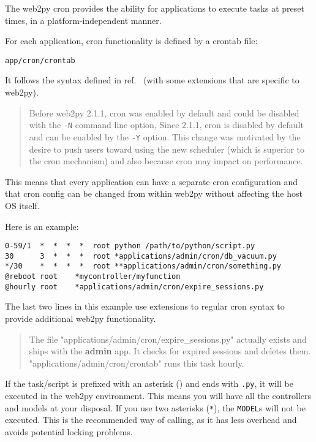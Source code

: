 \documentclass[justified,sixbynine,notoc]{tufte-book}
\def\ft{\small\tt}
\begin{document}
\begin{fullwidth}
The web2py cron provides the ability for applications to execute tasks at preset times, in a platform-independent manner.

For each application, cron functionality is defined by a crontab file:

\begin{lstlisting}
app/cron/crontab
\end{lstlisting}

It follows the syntax defined in ref.~\cite{cron} (with some extensions that are specific to web2py).

\begin{quote}Before web2py 2.1.1, cron was enabled by default and could be disabled with the {\ft -N} command line option, Since 2.1.1, cron is disabled by default and can be enabled by the {\ft -Y} option. This change was motivated by the desire to push users toward using the new scheduler (which is superior to the cron mechanism) and also because cron may impact on performance.\end{quote}
This means that every application can have a separate cron configuration and that cron config can be changed from within web2py without affecting the host OS itself.

Here is an example:
\begin{lstlisting}
0-59/1  *  *  *  *  root python /path/to/python/script.py
30      3  *  *  *  root *applications/admin/cron/db_vacuum.py
*/30    *  *  *  *  root **applications/admin/cron/something.py
@reboot root    *mycontroller/myfunction
@hourly root    *applications/admin/cron/expire_sessions.py
\end{lstlisting}

The last two lines in this example use extensions to regular cron syntax to provide additional web2py functionality.

\begin{quote}The file "applications/admin/cron/expire\_sessions.py" actually exists and ships with the {\bf admin} app. It checks for expired sessions and deletes them. "applications/admin/cron/crontab" runs this task hourly.\end{quote}
If the task/script is prefixed with an asterisk ({\ft *}) and ends with {\ft .py}, it will be executed in the web2py environment. This means you will have all the controllers and models at your disposal. If you use two asterisks ({\ft **}), the {\ft MODEL}s will not be executed. This is the recommended way of calling, as it has less overhead and avoids potential locking problems.


\end{fullwidth}
\end{document}
